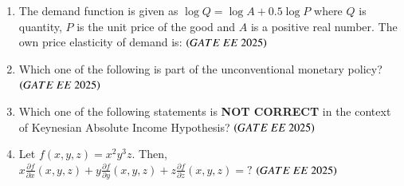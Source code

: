 \documentclass[journal,12pt,onecolumn]{IEEEtran}
\theoremstyle{remark}
\begin{document}
\begin{enumerate}
\item The demand function is given as
$
\log Q = \log A + 0.5 \log P
$
where $Q$ is quantity, $P$ is the unit price of the good and $A$ is a positive real number. The own price elasticity of demand is:
\hfill $\left(GATE\ EE\ 2025\right)$
\begin{enumerate}
\end{enumerate}
\item Which one of the following is part of the unconventional monetary policy?
\hfill $\left(GATE\ EE\ 2025\right)$
\begin{enumerate}
\end{enumerate}

\item Which one of the following statements is \textbf{NOT CORRECT} in the context of Keynesian Absolute Income Hypothesis?
\hfill $\left(GATE\ EE\ 2025\right)$
\begin{enumerate}
\end{enumerate}

\item Let $f(x,y,z) = x^2 y^3 z$. Then,
$
x \frac{\partial f}{\partial x}(x,y,z) + y \frac{\partial f}{\partial y}(x,y,z) + z \frac{\partial f}{\partial z}(x,y,z) = ?
$
\hfill $\left(GATE\ EE\ 2025\right)$
\begin{enumerate}
\end{enumerate}


\end{enumerate}
\end{document}
